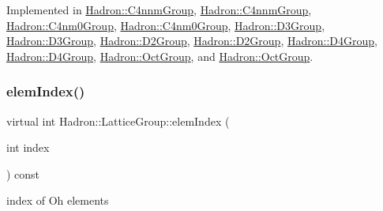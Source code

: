 Implemented in \mbox{\hyperlink{structHadron_1_1C4nnmGroup_ab40f44381ee83db2364e43bc2c3521e4}{Hadron\+::\+C4nnm\+Group}}, \mbox{\hyperlink{structHadron_1_1C4nnmGroup_ab40f44381ee83db2364e43bc2c3521e4}{Hadron\+::\+C4nnm\+Group}}, \mbox{\hyperlink{structHadron_1_1C4nm0Group_adc1a59b08c4fafae324e82e8ded86919}{Hadron\+::\+C4nm0\+Group}}, \mbox{\hyperlink{structHadron_1_1C4nm0Group_adc1a59b08c4fafae324e82e8ded86919}{Hadron\+::\+C4nm0\+Group}}, \mbox{\hyperlink{structHadron_1_1D3Group_a90114a92f0c05cdfd8ff56e33606d3c3}{Hadron\+::\+D3\+Group}}, \mbox{\hyperlink{structHadron_1_1D3Group_a90114a92f0c05cdfd8ff56e33606d3c3}{Hadron\+::\+D3\+Group}}, \mbox{\hyperlink{structHadron_1_1D2Group_a937ab7d9b4b21da1331b0c85728f7db9}{Hadron\+::\+D2\+Group}}, \mbox{\hyperlink{structHadron_1_1D2Group_a937ab7d9b4b21da1331b0c85728f7db9}{Hadron\+::\+D2\+Group}}, \mbox{\hyperlink{structHadron_1_1D4Group_a5969c3afe94d4c6ada166f7dc161a355}{Hadron\+::\+D4\+Group}}, \mbox{\hyperlink{structHadron_1_1D4Group_a5969c3afe94d4c6ada166f7dc161a355}{Hadron\+::\+D4\+Group}}, \mbox{\hyperlink{structHadron_1_1OctGroup_a1db49add38b9263bfd536b3da0cc1566}{Hadron\+::\+Oct\+Group}}, and \mbox{\hyperlink{structHadron_1_1OctGroup_a1db49add38b9263bfd536b3da0cc1566}{Hadron\+::\+Oct\+Group}}.

\mbox{\label{structHadron_1_1LatticeGroup_afb8e3ee60de059f75bce1044c694e1e8}} 
\subsubsection{\texorpdfstring{elemIndex()}{elemIndex()}\hspace{0.1cm}{\footnotesize\ttfamily [1/2]}}
{\footnotesize\ttfamily virtual int Hadron\+::\+Lattice\+Group\+::elem\+Index (\begin{DoxyParamCaption}\item[{int}]{index }\end{DoxyParamCaption}) const\hspace{0.3cm}{\ttfamily [pure virtual]}}

index of Oh elements 

